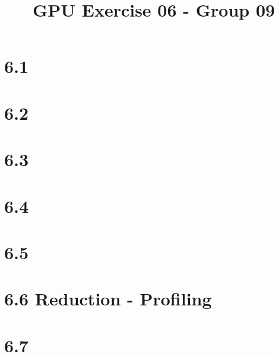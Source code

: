 \documentclass{report}
\begin{document}
\title{GPU Exercise 06 - Group 09}
\maketitle

\section*{6.1}

\section*{6.2}
   
\section*{6.3}

\section*{6.4}

\section*{6.5}

\section*{6.6 Reduction - Profiling}

\section*{6.7}
\end{document}
